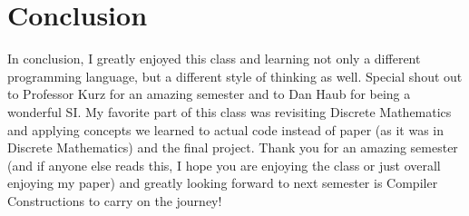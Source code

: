 \documentclass{article}
\begin{document}
\section{Conclusion}\label{conclusion}
In conclusion, I greatly enjoyed this class and learning not only a different programming language, but a different style of thinking as well. Special shout out to Professor Kurz for an amazing semester and to Dan Haub for being a wonderful SI. My favorite part of this class was revisiting Discrete Mathematics and applying concepts we learned to actual code instead of paper (as it was in Discrete Mathematics) and the final project. Thank you for an amazing semester (and if anyone else reads this, I hope you are enjoying the class or just overall enjoying my paper) and greatly looking forward to next semester is Compiler Constructions to carry on the journey!
\end{document}

